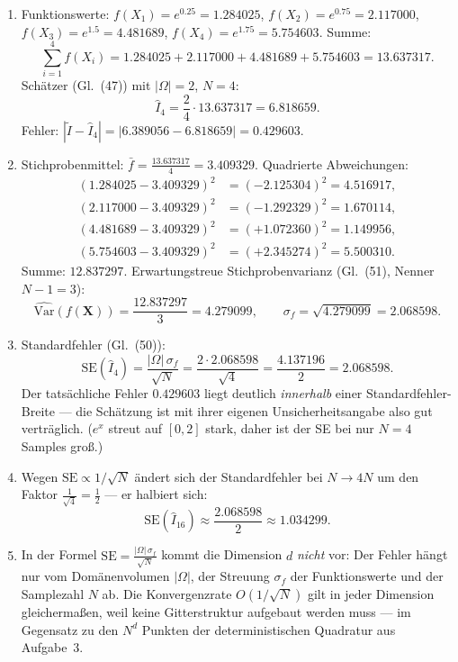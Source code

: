 \documentclass[a4paper,11pt]{scrartcl}
\begin{document}
\begin{enumerate}[label=(\alph*)]
  \item Funktionswerte: $f(X_1) = e^{0.25} = 1.284025$, $f(X_2) = e^{0.75} = 2.117000$, $f(X_3) = e^{1.5} = 4.481689$, $f(X_4) = e^{1.75} = 5.754603$. Summe:
  \[ \sum_{i=1}^4 f(X_i) = 1.284025 + 2.117000 + 4.481689 + 5.754603 = 13.637317. \]
  Schätzer (Gl.~(47)) mit $|\Omega| = 2$, $N = 4$:
  \[ \hat{I}_4 = \frac{2}{4} \cdot 13.637317 = 6.818659. \]
  Fehler: $|\tilde{I} - \hat{I}_4| = |6.389056 - 6.818659| = 0.429603$.
  \item Stichprobenmittel: $\bar{f} = \frac{13.637317}{4} = 3.409329$. Quadrierte Abweichungen:
  \begin{align*}
  (1.284025 - 3.409329)^2 &= (-2.125304)^2 = 4.516917, \\
  (2.117000 - 3.409329)^2 &= (-1.292329)^2 = 1.670114, \\
  (4.481689 - 3.409329)^2 &= (+1.072360)^2 = 1.149956, \\
  (5.754603 - 3.409329)^2 &= (+2.345274)^2 = 5.500310.
  \end{align*}
  Summe: $12.837297$. Erwartungstreue Stichprobenvarianz (Gl.~(51), Nenner $N - 1 = 3$):
  \[ \widehat{\text{Var}}(f(\mathbf{X})) = \frac{12.837297}{3} = 4.279099, \qquad \sigma_f = \sqrt{4.279099} = 2.068598. \]
  \item Standardfehler (Gl.~(50)):
  \[ \text{SE}(\hat{I}_4) = \frac{|\Omega|\,\sigma_f}{\sqrt{N}} = \frac{2 \cdot 2.068598}{\sqrt{4}} = \frac{4.137196}{2} = 2.068598. \]
  Der tatsächliche Fehler $0.429603$ liegt deutlich \emph{innerhalb} einer Standardfehler-Breite --- die Schätzung ist mit ihrer eigenen Unsicherheitsangabe also gut verträglich. ($e^x$ streut auf $[0,2]$ stark, daher ist der SE bei nur $N = 4$ Samples groß.)
  \item Wegen $\text{SE} \propto 1/\sqrt{N}$ ändert sich der Standardfehler bei $N \to 4N$ um den Faktor $\frac{1}{\sqrt{4}} = \frac{1}{2}$ --- er halbiert sich:
  \[ \text{SE}(\hat{I}_{16}) \approx \frac{2.068598}{2} \approx 1.034299. \]
  \item In der Formel $\text{SE} = \frac{|\Omega|\,\sigma_f}{\sqrt{N}}$ kommt die Dimension $d$ \emph{nicht} vor: Der Fehler hängt nur vom Domänenvolumen $|\Omega|$, der Streuung $\sigma_f$ der Funktionswerte und der Samplezahl $N$ ab. Die Konvergenzrate $O(1/\sqrt{N})$ gilt in jeder Dimension gleichermaßen, weil keine Gitterstruktur aufgebaut werden muss --- im Gegensatz zu den $N^d$ Punkten der deterministischen Quadratur aus Aufgabe~3.
\end{enumerate}
\end{document}
